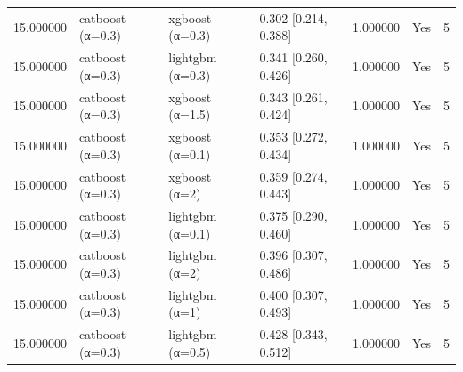 \begin{longtable}{rlllrlr}
15.000000 & catboost (α=0.3) & xgboost (α=0.3) & 0.302 [0.214, 0.388] & 1.000000 & Yes & 5 \\
15.000000 & catboost (α=0.3) & lightgbm (α=0.3) & 0.341 [0.260, 0.426] & 1.000000 & Yes & 5 \\
15.000000 & catboost (α=0.3) & xgboost (α=1.5) & 0.343 [0.261, 0.424] & 1.000000 & Yes & 5 \\
15.000000 & catboost (α=0.3) & xgboost (α=0.1) & 0.353 [0.272, 0.434] & 1.000000 & Yes & 5 \\
15.000000 & catboost (α=0.3) & xgboost (α=2) & 0.359 [0.274, 0.443] & 1.000000 & Yes & 5 \\
15.000000 & catboost (α=0.3) & lightgbm (α=0.1) & 0.375 [0.290, 0.460] & 1.000000 & Yes & 5 \\
15.000000 & catboost (α=0.3) & lightgbm (α=2) & 0.396 [0.307, 0.486] & 1.000000 & Yes & 5 \\
15.000000 & catboost (α=0.3) & lightgbm (α=1) & 0.400 [0.307, 0.493] & 1.000000 & Yes & 5 \\
15.000000 & catboost (α=0.3) & lightgbm (α=0.5) & 0.428 [0.343, 0.512] & 1.000000 & Yes & 5 \\
\end{longtable}
